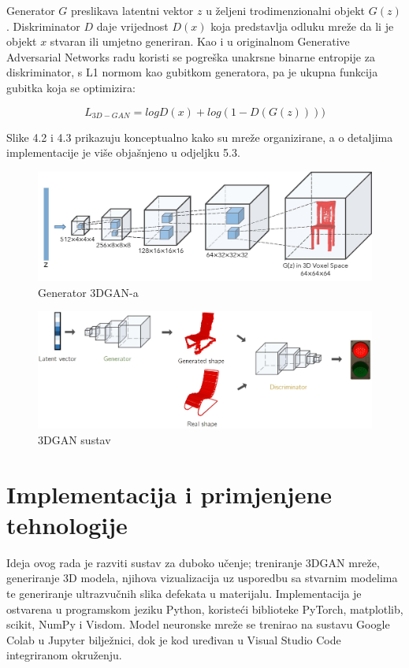 \documentclass[times, utf8, diplomski]{fer}
\begin{document}
Generator \(G\) preslikava latentni vektor \(z\) u željeni trodimenzionalni objekt \(G(z)\). Diskriminator \(D\) daje vrijednost \(D(x)\) koja predstavlja odluku mreže da li je objekt \(x\) stvaran ili umjetno generiran.
Kao i u originalnom Generative Adversarial Networks radu \cite{GAN} koristi se pogreška unakrsne binarne entropije za diskriminator, s L1 normom kao gubitkom generatora, pa je ukupna funkcija gubitka koja se optimizira: \cite{3dgan}

\begin{equation}\label{eq:pythagoras}
 L_{3D-GAN} = log D(x) + log (1 - D(G(z))))
\end{equation}

Slike 4.2 i 4.3 prikazuju konceptualno kako su mreže organizirane, a o detaljima implementacije je više objašnjeno u odjeljku 5.3.

\begin{figure}[h]
\centering
\includegraphics[scale=0.5]{3dgan_gen.jpg}
\caption{Generator 3DGAN-a \cite{3dgan_home}}
\end{figure}

\begin{figure}[h]
\centering
\includegraphics[scale=0.25]{3DGAN_all.png}
\caption{3DGAN sustav \cite{3dgan_all}}
\end{figure}

\break

\chapter{Implementacija i primjenjene tehnologije}
Ideja ovog rada je razviti sustav za duboko učenje; treniranje 3DGAN mreže, generiranje 3D modela, njihova vizualizacija uz usporedbu sa stvarnim modelima te generiranje ultrazvučnih slika defekata u materijalu. Implementacija je ostvarena u programskom jeziku Python, koristeći biblioteke PyTorch, matplotlib, scikit, NumPy i Visdom. Model neuronske mreže se trenirao na sustavu Google Colab u Jupyter bilježnici, dok je kod uređivan u Visual Studio Code integriranom okruženju.
\end{document}
